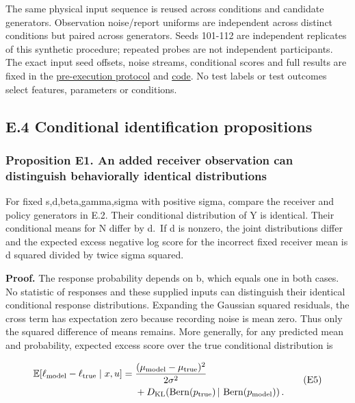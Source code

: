 \documentclass[
  american,
  11pt,
  letterpaper,
]{article}
\begin{document}
The same physical input sequence is reused across conditions and candidate generators. Observation noise/report uniforms are independent across distinct conditions but paired across generators. Seeds 101-112 are independent replicates of this synthetic procedure; repeated probes are not independent participants. The exact input seed offsets, noise streams, conditional scores and full results are fixed in the \href{https://github.com/v5ma/v5ma.github.io/blob/master/papers/companions/learning-to-feel-v1.0/ARTIFACT-AVAILABILITY.md#artifact-9}{pre-execution protocol} and \href{https://github.com/v5ma/v5ma.github.io/blob/master/papers/companions/learning-to-feel-v1.0/analysis/joint-receiver-comparison.mjs}{code}. No test labels or test outcomes select features, parameters or conditions.

\subsection{E.4 Conditional identification propositions}\label{e.4-conditional-identification-propositions}

\subsubsection{Proposition E1. An added receiver observation can distinguish behaviorally identical distributions}\label{proposition-e1.-an-added-receiver-observation-can-distinguish-behaviorally-identical-distributions}

For fixed s,d,beta,gamma,sigma with positive sigma, compare the receiver and policy generators in E.2. Their conditional distribution of Y is identical. Their conditional means for N differ by d.~If d is nonzero, the joint distributions differ and the expected excess negative log score for the incorrect fixed receiver mean is d squared divided by twice sigma squared.

\textbf{Proof.} The response probability depends on b, which equals one in both cases. No statistic of responses and these supplied inputs can distinguish their identical conditional response distributions. Expanding the Gaussian squared residuals, the cross term has expectation zero because recording noise is mean zero. Thus only the squared difference of means remains. More generally, for any predicted mean and probability, expected excess score over the true conditional distribution is

\[
\begin{aligned}
\mathbb E[\ell_{\rm model}-\ell_{\rm true}\mid x,u]
 ={}&\frac{(\mu_{\rm model}-\mu_{\rm true})^2}{2\sigma^2}\\
 &+D_{\rm KL}\!\left(\operatorname{Bern}(p_{\rm true})\,|\,
                         \operatorname{Bern}(p_{\rm model})\right).
\end{aligned}\tag{E5}
\]
\end{document}
